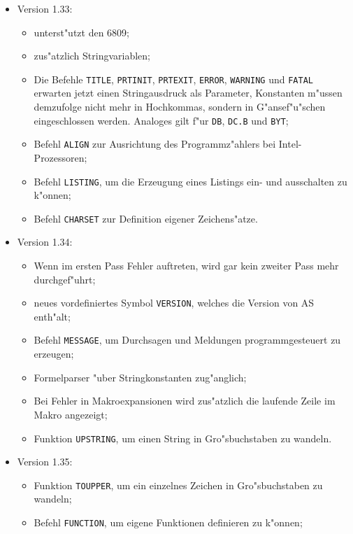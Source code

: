 \documentclass[12pt,a4paper,twoside]{report}
\newcommand{\tty}[1]{{\tt #1}}
\newcommand{\asname}{AS}
\begin{document}
\begin{itemize}
{\begin{itemize}
      \end{itemize}}
\item{Version 1.33:
      \begin{itemize}
      \item{unterst"utzt den 6809;}
      \item{zus"atzlich Stringvariablen;}
      \item{Die Befehle \tty{TITLE}, \tty{PRTINIT}, \tty{PRTEXIT},
            \tty{ERROR}, \tty{WARNING} und \tty{FATAL} erwarten jetzt
	    einen Stringausdruck als Parameter, Konstanten
            m"ussen demzufolge nicht mehr in Hochkommas, sondern in
            G"ansef"u"schen eingeschlossen werden. Analoges gilt f"ur \tty{DB},
            \tty{DC.B} und \tty{BYT};}
      \item{Befehl \tty{ALIGN} zur Ausrichtung des Programmz"ahlers bei Intel-
            Prozessoren;}
      \item{Befehl \tty{LISTING}, um die Erzeugung eines Listings ein- und
            ausschalten zu k"onnen;}
      \item{Befehl \tty{CHARSET} zur Definition eigener Zeichens"atze.}
      \end{itemize}}
\item{Version 1.34:
      \begin{itemize}
      \item{Wenn im ersten Pass Fehler auftreten, wird gar kein zweiter
            Pass mehr durchgef"uhrt;}
      \item{neues vordefiniertes Symbol \tty{VERSION}, welches die Version von
            \asname{} enth"alt;}
      \item{Befehl \tty{MESSAGE}, um Durchsagen und Meldungen programmgesteuert
            zu erzeugen;}
      \item{Formelparser "uber Stringkonstanten zug"anglich;}
      \item{Bei Fehler in Makroexpansionen wird zus"atzlich die laufende
            Zeile im Makro angezeigt;}
      \item{Funktion \tty{UPSTRING}, um einen String in Gro"sbuchstaben zu
            wandeln.}
      \end{itemize}}
\item{Version 1.35:
      \begin{itemize}
      \item{Funktion \tty{TOUPPER}, um ein einzelnes Zeichen in Gro"sbuchstaben
            zu wandeln;}
      \item{Befehl \tty{FUNCTION}, um eigene Funktionen definieren zu k"onnen;}

\end{itemize}}
\end{itemize}
\end{document}
